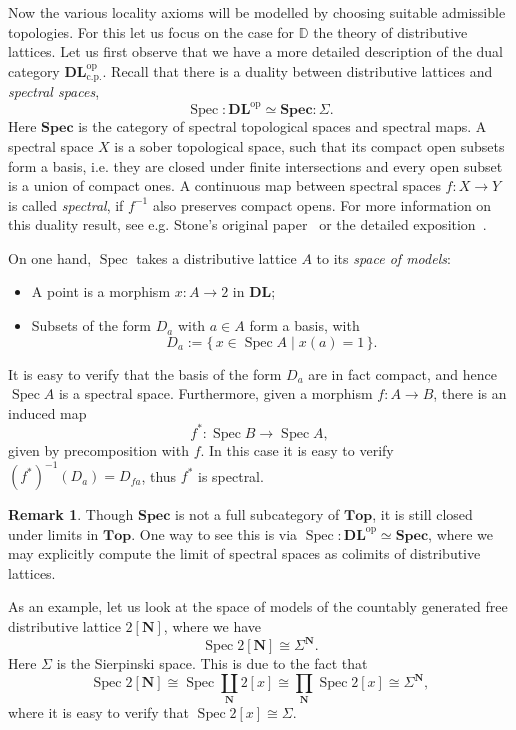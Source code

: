 \documentclass[12pt]{amsart}
\theoremstyle{definition}
\newtheorem{remark}[theorem]{Remark}
\newcommand{\mb}[1]{\mathbf{#1}}
\newcommand{\mbb}[1]{\mathbb{#1}}
\newcommand{\mr}[1]{\mathrm{#1}}
\newcommand{\DL}{\mb{DL}}
\newcommand{\op}{^{\mathrm{op}}}
\newcommand{\inv}{^{\mathrm{-1}}}
\newcommand{\scomp}[2]{\{\,#1\mid#2\,\}}
\newcommand{\cp}{_{\mr{c.p.}}}
\newcommand{\N}{\mb N}
\newcommand{\Topp}{\mb{Top}}
\newcommand{\Spec}{\mb{Spec}}
\newcommand{\spec}{\operatorname{Spec}}
\begin{document}
Now the various locality axioms will be modelled by choosing suitable admissible topologies. For this let us focus on the case for $\mbb D$ the theory of distributive lattices. Let us first observe that we have a more detailed description of the dual category $\DL\cp\op$. Recall that there is a duality between distributive lattices and \emph{spectral spaces},
\[ \spec : \DL\op \simeq \Spec : \Sigma. \]
Here $\Spec$ is the category of spectral topological spaces and spectral maps. A spectral space $X$ is a sober topological space, such that its compact open subsets form a basis, i.e. they are closed under finite intersections and every open subset is a union of compact ones. A continuous map between spectral spaces $f : X \to Y$ is called \emph{spectral}, if $f\inv$ also preserves compact opens. For more information on this duality result, see e.g. Stone's original paper~\cite{stone1938topological} or the detailed exposition~\cite{bezhanishvili2010bitopological}.

On one hand, $\spec$ takes a distributive lattice $A$ to its \emph{space of models}:
\begin{itemize}
  \item A point is a morphism $x : A \to 2$ in $\DL$;
  \item Subsets of the form $D_a$ with $a\in A$ form a basis, with 
  \[ D_a := \scomp{x \in \spec A}{x(a) = 1}. \]
\end{itemize}
It is easy to verify that the basis of the form $D_a$ are in fact compact, and hence $\spec A$ is a spectral space. Furthermore, given a morphism $f : A \to B$, there is an induced map
\[ f^* : \spec B \to \spec A, \]
given by precomposition with $f$. In this case it is easy to verify $(f^*)\inv(D_a) = D_{fa}$, thus $f^*$ is spectral.

\begin{remark}
  Though $\Spec$ is not a full subcategory of $\Topp$, it is still closed under limits in $\Topp$. One way to see this is via $\spec : \DL\op \simeq \Spec$, where we may explicitly compute the limit of spectral spaces as colimits of distributive lattices.
\end{remark}

As an example, let us look at the space of models of the countably generated free distributive lattice $2[\N]$, where we have 
\[ \spec 2[\N] \cong \Sigma^\N. \] 
Here $\Sigma$ is the Sierpinski space. This is due to the fact that
\[ \spec 2[\N] \cong \spec\coprod_{\N} 2[x] \cong \prod_{\N} \spec 2[x] \cong \Sigma^\N, \]
where it is easy to verify that $\spec 2[x] \cong \Sigma$. 
\end{document}
